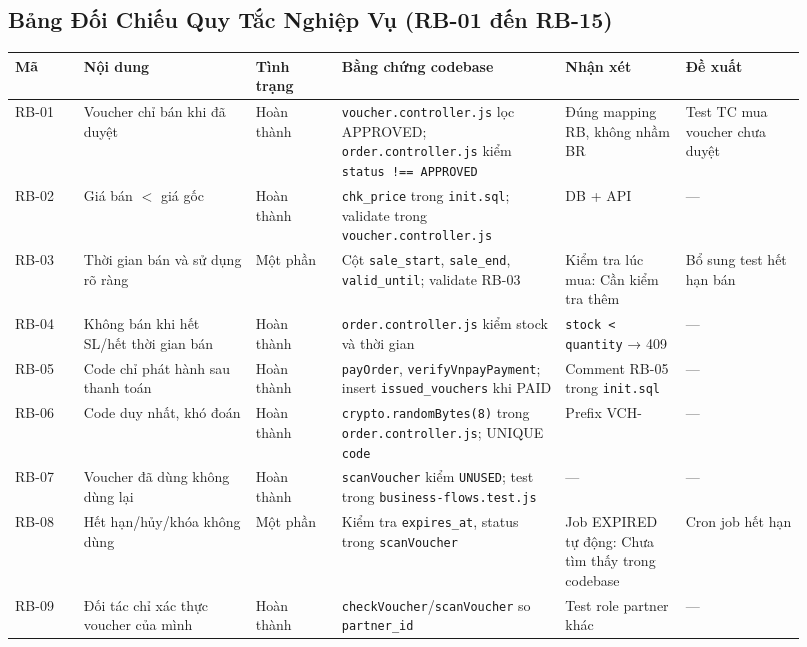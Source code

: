 \subsection{Bảng Đối Chiếu Quy Tắc Nghiệp Vụ (RB-01 đến RB-15)}
\begin{longtable}{>{\raggedright\arraybackslash}p{0.08\linewidth}>{\raggedright\arraybackslash}p{0.20\linewidth}>{\raggedright\arraybackslash}p{0.10\linewidth}>{\raggedright\arraybackslash}p{0.26\linewidth}>{\raggedright\arraybackslash}p{0.14\linewidth}>{\raggedright\arraybackslash}p{0.14\linewidth}}
\toprule
\textbf{Mã} & \textbf{Nội dung} & \textbf{Tình trạng} & \textbf{Bằng chứng codebase} & \textbf{Nhận xét} & \textbf{Đề xuất}\\
\midrule
\endhead
RB-01 & Voucher chỉ bán khi đã duyệt & Hoàn thành & \texttt{voucher.controller.js} lọc APPROVED; \texttt{order.controller.js} kiểm \texttt{status !== APPROVED} & Đúng mapping RB, không nhầm BR & Test TC mua voucher chưa duyệt\\
RB-02 & Giá bán $<$ giá gốc & Hoàn thành & \texttt{chk\_price} trong \texttt{init.sql}; validate trong \texttt{voucher.controller.js} & DB + API & —\\
RB-03 & Thời gian bán và sử dụng rõ ràng & Một phần & Cột \texttt{sale\_start}, \texttt{sale\_end}, \texttt{valid\_until}; validate RB-03 & Kiểm tra lúc mua: Cần kiểm tra thêm & Bổ sung test hết hạn bán\\
RB-04 & Không bán khi hết SL/hết thời gian bán & Hoàn thành & \texttt{order.controller.js} kiểm stock và thời gian & \texttt{stock < quantity} → 409 & —\\
RB-05 & Code chỉ phát hành sau thanh toán & Hoàn thành & \texttt{payOrder}, \texttt{verifyVnpayPayment}; insert \texttt{issued\_vouchers} khi PAID & Comment RB-05 trong \texttt{init.sql} & —\\
RB-06 & Code duy nhất, khó đoán & Hoàn thành & \texttt{crypto.randomBytes(8)} trong \texttt{order.controller.js}; UNIQUE \texttt{code} & Prefix VCH- & —\\
RB-07 & Voucher đã dùng không dùng lại & Hoàn thành & \texttt{scanVoucher} kiểm \texttt{UNUSED}; test trong \texttt{business-flows.test.js} & — & —\\
RB-08 & Hết hạn/hủy/khóa không dùng & Một phần & Kiểm tra \texttt{expires\_at}, status trong \texttt{scanVoucher} & Job EXPIRED tự động: Chưa tìm thấy trong codebase & Cron job hết hạn\\
RB-09 & Đối tác chỉ xác thực voucher của mình & Hoàn thành & \texttt{checkVoucher}/\texttt{scanVoucher} so \texttt{partner\_id} & Test role partner khác & —\\

\end{longtable}
